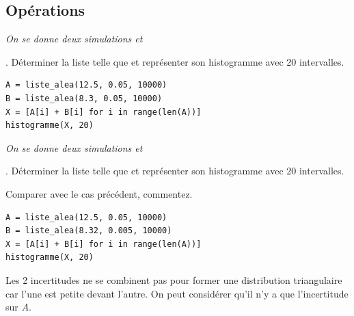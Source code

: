\subsection{Opérations}
\begin{Exercise}\it 
On se donne deux simulations  et 

. Déterminer la liste  telle que  et représenter son histogramme avec 20 intervalles.
\end{Exercise}
\begin{Answer}
\begin{lstlisting}
A = liste_alea(12.5, 0.05, 10000)
B = liste_alea(8.3, 0.05, 10000)
X = [A[i] + B[i] for i in range(len(A))]
histogramme(X, 20)
\end{lstlisting}
\end{Answer}
\begin{Exercise}\it 
On se donne deux simulations  et 

. Déterminer la liste  telle que  et représenter son histogramme avec 20 intervalles.

Comparer avec le cas précédent, commentez.
\end{Exercise}
\begin{Answer}
\begin{lstlisting}
A = liste_alea(12.5, 0.05, 10000)
B = liste_alea(8.32, 0.005, 10000)
X = [A[i] + B[i] for i in range(len(A))]
histogramme(X, 20)
\end{lstlisting}
Les 2 incertitudes ne se combinent pas pour former une distribution triangulaire car l'une est petite devant l'autre. On peut considérer qu'il n'y a que l'incertitude sur $A$.
\end{Answer}
